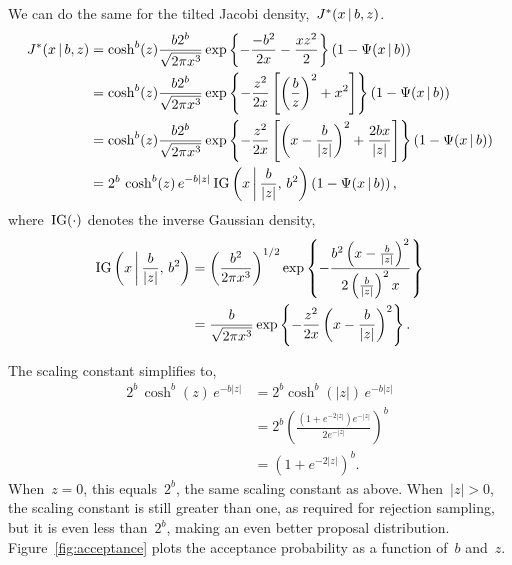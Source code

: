 \documentclass[aos,preprint]{imsart}
\begin{document}
We can do the same for the tilted Jacobi density,~$J^{*}(x \,|\, b,z)$.
\begin{align}
  \distJacobi(x \given b, z) 
  &= \cosh^b(z) \frac{b 2^b}{\sqrt{2\pi x^3}} 
    \exp \left \{ -\frac{-b^2}{2x} - \frac{xz^2}{2} \right \}
    \left( 1-\Psi(x \given b) \right) \\
  &= \cosh^b(z) \frac{b 2^b}{\sqrt{2\pi x^3}} 
    \exp \left \{ -\frac{z^2}{2x} \left[\left( \frac{b}{z} \right)^2 + x^2 \right]\right \}
    \left( 1-\Psi(x \given b) \right) \\
  &= \cosh^b(z) \frac{b 2^b}{\sqrt{2\pi x^3}} 
    \exp \left \{ -\frac{z^2}{2x} \left[\left( x- \frac{b}{|z|} \right)^2  +\frac{2bx}{|z|}\right]\right \}
    \left( 1-\Psi(x \given b) \right) \\
  &= 2^b \, \cosh^b(z) \, e^{-b|z|} \,
    \distInvGaussian \left(x \, \bigg| \, \frac{b}{|z|}, \, b^2 \right) 
    \left( 1-\Psi(x \given b) \right),
\end{align}
where~$\mathrm{IG}(\cdot)$ denotes the inverse Gaussian density,
\begin{align}
\distInvGaussian\left(x \, \bigg| \, \frac{b}{|z|}, \, b^2 \right) 
  &= \left( \frac{b^2}{2\pi x^3} \right)^{1/2} 
    \exp \left \{ - \frac{b^2 \left(x - \tfrac{b}{|z|} \right)^2}{2 \left(\tfrac{b}{|z|} \right)^2 x}   \right \} \\
  &= \frac{b}{\sqrt{2\pi x^3}}
    \exp \left \{ - \frac{z^2}{2x}  \left(x - \frac{b}{|z|} \right)^2   \right \}.
\end{align}

The scaling constant simplifies to,
\begin{align}
2^b \, \cosh^b(z) \, e^{-b|z|} 
  &= 2^b \cosh^b(|z|) \, e^{-b|z|} \\
  &= 2^b \left(\frac{(1+e^{-2|z|}) e^{-|z|}}{2e^{-|z|}} \right)^b \\
  &= \left(1 + e^{-2|z|} \right)^b.
\end{align}
When~$z=0$, this equals~$2^b$, the same scaling constant as above. When~$|z|>0$, the scaling constant is still greater than one, as required for rejection sampling, but it is even less than~$2^b$, making an even better proposal distribution. Figure~\ref{fig:acceptance} plots the acceptance probability as a function of~$b$ and~$z$.
\end{document}
